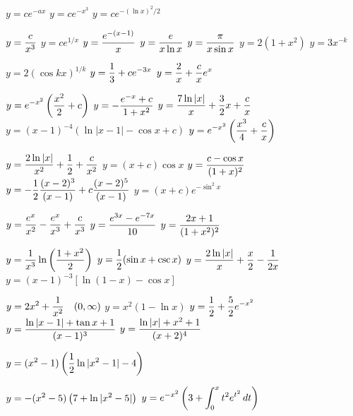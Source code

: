 \medskip

   $y=ce^{-ax}$
   $y=ce^{-x^{3}}$
   $y=ce^{-(\ln x)^{2}/2}$

   $\displaystyle{y=\frac{c}{x^{3}}}$
   $y=ce^{1/x}$
    $\displaystyle{y=\frac{e^{-(x-1)}}{x}}$
   $\displaystyle{y=\frac{e}{x\ln x}}$
   $\displaystyle{y=\frac{\pi}{x\sin x}}$
   $y=2(1+x^{2})$
   $y=3x^{-k}$

   $y=2(\cos kx)^{1/k}$
   $\displaystyle{y=\frac{1}{3}+ce^{-3x}}$
   $\displaystyle{y=\frac{2}{x}+\frac{c}{x}e^{x}}$

$\displaystyle{y=e^{-x^{2}}\left(\frac{x^{2}}{2}+c\right)}$
$y=-\displaystyle\frac{e^{-x}+c}{1+x^{2}}$
   $\displaystyle{y=\frac{7\ln|x|}{x}+\frac{3}{2}x+\frac{c}{x}}$
   $y=(x-1)^{-4}(\ln|x-1|-\cos
x+c)$
   $\displaystyle{y=e^{-x^{2}}\left(\frac{x^{3}}{4}+\frac{c}{x}\right)}$

   $\displaystyle{y=\frac{2\ln|x|}{x^{2}}+
\frac{1}{2}+\frac{c}{x^{2}}}$
   $y=(x+c)\cos x$
   $\displaystyle{y=\frac{c-\cos x}{(1+x)^{2}}}$
   $\displaystyle{y=-\frac{1}{2}\frac{(x-2)^{3}}{(x-1)}+c\frac{(x-2)^{5}}{(x-1)}}$
   $y=(x+c)e^{-\sin^{2}x}$

$y=\displaystyle{\frac{e^{x}}{x^{2}}-\frac{e^{x}}{x^{3}}+\frac{c}{x^{3}}}$
 $y=\displaystyle{\frac{e^{3x}-e^{-7x}}{10}}$
   $\displaystyle{y=\frac{2x+1}{(1+x^{2})^{2}}}$

$y=\displaystyle{\frac{1}{x^{3}}\ln\left(\frac{1+x^{2}}{2}\right)}$
   $\displaystyle{y=\frac{1}{2}(\sin x+\csc x)}$
    $y=\displaystyle{\frac{2\ln|x|}{x}+\frac{x}{2}-
\frac{1}{2x}}$
  $y=(x-1)^{-3}\left[\ln(1-x)-\cos x\right]$

   $\displaystyle{y=2x^{2}+\frac{1}{x^{2}}\quad(0,\infty)}$
   $y=x^{2}(1-\ln x)$
   $\displaystyle{y=\frac{1}{2}+\frac{5}{2}e^{-x^{2}}}$
   $\displaystyle{y=\frac{\ln|x-1|+\tan x+1}{(x-1)^{3}}}$
$\displaystyle{y=\frac{\ln|x|+x^{2}+1}{(x+2)^{4}}}$

$\displaystyle{y=(x^{2}-1)\left(\displaystyle{\frac{1}{2}
\ln|x^{2}-1|-4}\right)}$

$\displaystyle{y=-(x^{2}-5)\left(7+\ln|x^{2}-5|\right)}$
 $\displaystyle{y=e^{-x^{2}}\left(3+\int^{x}_{0}
t^{2}e^{t^{2}}\,dt\right)}$

